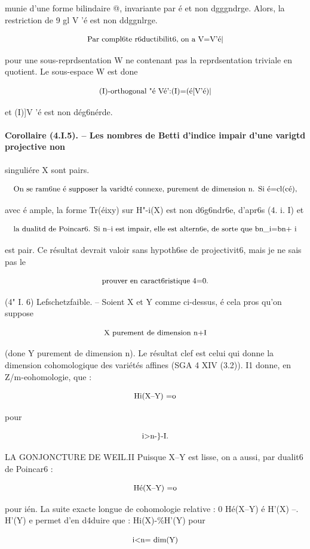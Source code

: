 \documentclass[11pt]{article}
\theoremstyle{remark}
\begin{document}
munie d'une forme bilindaire @, invariante par é et non dgggndrge. Alors, la restriction de  9 gl V 'é est non ddggnlrge.

\[\text{\small Par compl6te r6ductibilit6, on a V=V'é|}\]

pour une sous-reprdsentation W ne contenant pas la reprdsentation triviale en quotient. Le sous-espace W est done

\[\text{\small (I)-orthogonal "é Vé':(I)=(é[V'é)|}\]

et (I)]V 'é est non dég6nérde.

\paragraph{Corollaire (4.I.5). -- Les nombres de Betti d'indice impair d'une varigtd projective non}

singuliére X sont pairs.

\[\text{\small On se ram6ne é supposer la varidté connexe, purement de dimension n. Si é=cl(cé),}\]

avec é ample, la forme Tr(éixy) sur H"-i(X) est non d6g6ndr6e, d'apr6s (4. i. I) et

\[\text{\small la dualitd de Poincar6. Si n--i est impair, elle est altern6e, de sorte que bn\_i=bn+ i}\]

est pair. Ce résultat devrait valoir sans hypoth6se de projectivit6, mais je ne sais pas le

\[\text{\small prouver en caract6ristique 4=0.}\]

(4" I. 6) Lefschetzfaible. -- Soient X et Y comme ci-dessus, é cela pros qu'on suppose

\[\text{\small X purement de dimension n+I}\]

(done Y purement de dimension n). Le résultat clef est celui qui donne la dimension cohomologique des variétés affines (SGA 4 XIV (3.2)). I1 donne, en Z/m-eohomologie, que :

\[\text{\small Hi(X--Y) =o}\]

pour

\[\text{\small i>n-\}-I.}\]

LA GONJONCTURE DE WEIL.II Puisque X--Y est lisse, on a aussi, par dualit6 de Poincar6 :

\[\text{\small Hé(X--Y) =o}\]

pour ién. La suite exacte longue de cohomologie relative : 0 Hé(X--Y) é H'(X) --. H'(Y) e permet d'en d4duire que : Hi(X)-\%H'(Y) pour

\[\text{\small i<n= dim(Y)}\]
\end{document}

